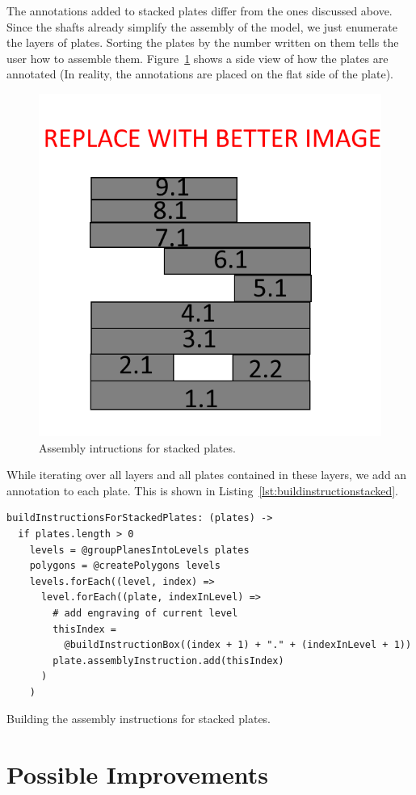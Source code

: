 \documentclass[../ClassicThesis.tex]{subfiles}
\begin{document}
The annotations added to stacked plates differ from the ones discussed above. Since the shafts already simplify the assembly of the model, we just enumerate the layers of plates. Sorting the plates by the number written on them tells the user how to assemble them. Figure~\ref{fig:assemblystacked} shows a side view of how the plates are annotated (In reality, the annotations are placed on the flat side of the plate).

\begin{figure}
    \centering
    \includegraphics[width=0.5\columnwidth]{Images/assembly_stacked.png}
    \caption{Assembly intructions for stacked plates.}
    \label{fig:assemblystacked}
\end{figure}

While iterating over all layers and all plates contained in these layers, we add an annotation to each plate. This is shown in Listing~\ref{lst:buildinstructionstacked}.

\begin{listing}
\begin{verbatim}
buildInstructionsForStackedPlates: (plates) ->
  if plates.length > 0
    levels = @groupPlanesIntoLevels plates
    polygons = @createPolygons levels
    levels.forEach((level, index) =>
      level.forEach((plate, indexInLevel) =>
        # add engraving of current level
        thisIndex =
          @buildInstructionBox((index + 1) + "." + (indexInLevel + 1))
        plate.assemblyInstruction.add(thisIndex)
      )
    )
\end{verbatim}
\caption{Building the assembly instructions for stacked plates.}
\label{lst:buildinstructionstacked}
\end{listing}

\section{Possible Improvements}\label{sec:assemblyimprovements}
\end{document}
